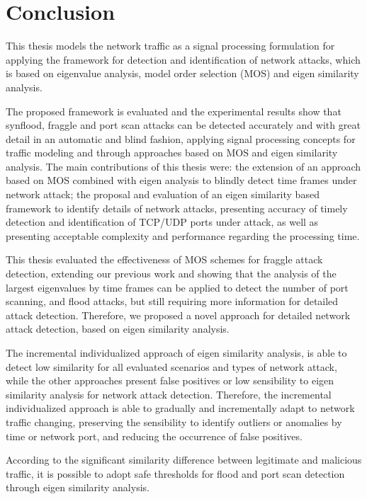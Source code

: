 \section{Conclusion}
\label{sc:conc_conclusion}

This thesis models the network traffic as a signal processing formulation for applying the framework for detection and identification of network attacks, which is based on eigenvalue analysis, model order selection (MOS) and eigen similarity analysis.

The proposed framework is evaluated and the experimental results show that synflood, fraggle and port scan attacks can be detected accurately and with great detail in an automatic and blind fashion, applying signal processing concepts for traffic modeling and through approaches based on MOS and eigen similarity analysis. The main contributions of this thesis were: the extension of an approach based on MOS combined with eigen analysis to blindly detect time frames under network attack; the proposal and evaluation of an eigen similarity based framework to identify details of network attacks, presenting accuracy of timely detection and identification of TCP/UDP ports under attack, as well as presenting acceptable complexity and performance regarding the processing time.

This thesis evaluated the effectiveness of MOS schemes for fraggle attack detection, extending our previous work \cite{tenorio2013greatest} and showing that the analysis of the largest eigenvalues by time frames can be applied to detect the number of port scanning, and flood attacks, but still requiring more information for detailed attack detection. Therefore, we proposed a novel approach for detailed network attack detection, based on eigen similarity analysis.

The incremental individualized approach of eigen similarity analysis, is able to detect low similarity for all evaluated scenarios and types of network attack, while the other approaches present false positives or low sensibility to eigen similarity analysis for network attack detection. Therefore, the incremental individualized approach is able to gradually and incrementally adapt to network traffic changing, preserving the sensibility to identify outliers or anomalies by time or network port, and reducing the occurrence of false positives.

According to the significant similarity difference between legitimate and malicious traffic, it is possible to adopt safe thresholds for flood and port scan detection through eigen similarity analysis.


